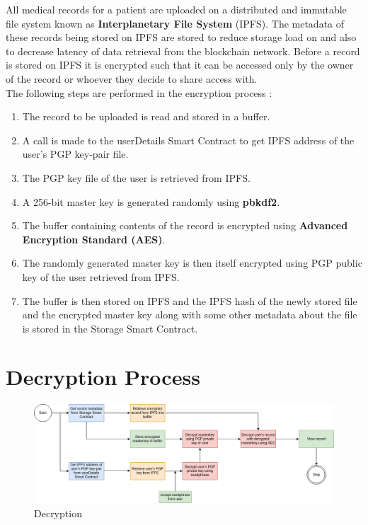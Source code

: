 All medical records for a patient are uploaded on a distributed and immutable file system known as \textbf{Interplanetary File System} (IPFS). The metadata of these records being stored on IPFS are stored to reduce storage load on and also to decrease latency of data retrieval from the blockchain network. Before a record is stored on IPFS it is encrypted such that it can be accessed only by the owner of the record or whoever they decide to share access with. \\ The following steps are performed in the encryption process :
\begin{enumerate}
   \item The record to be uploaded is read and stored in a buffer.
   \item A call is made to the userDetails Smart Contract to get IPFS address of the user’s PGP key-pair file.
   \item The PGP key file of the user is retrieved from IPFS.
   \item A 256-bit master key is generated randomly using \textbf{pbkdf2}.
   \item The buffer containing contents of the record is encrypted using \textbf{Advanced Encryption Standard (AES)}. 
   \item The randomly generated master key is then itself encrypted using PGP public key of the user retrieved from IPFS.
   \item The buffer is then stored on IPFS and the IPFS hash of the newly stored file and the encrypted master key along with some other metadata about the file is stored in the Storage Smart Contract. 
\end{enumerate}
\section{Decryption Process}
\begin{figure}[!b]
	\centering
	\includegraphics[width=\linewidth]{Images/Decryption.png}
	\caption{Decryption}
\end{figure} 

